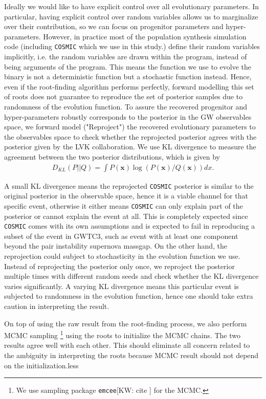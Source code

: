 \documentclass[twocolumn]{aastex631}
\newcommand{\kw}[1]{{\color{rb4}[KW: #1 ]}}
\begin{document}
Ideally we would like to have explicit control over all evolutionary parameters.
In particular, having explicit control over random variables allows us to marginalize over their contribution, so we can focus on progenitor parameters and hyper-parameters.
However, in practice most of the population synthesis simulation code (including \texttt{COSMIC} which we use in this study.) define their random variables implicitly,
i.e. the random variables are drawn within the program, instead of being arguments of the program.
This means the function we use to evolve the binary is not a deterministic function but a stochastic function instead. 
Hence, even if the root-finding algorithm performs perfectly,
forward modelling this set of roots does not guarantee to reproduce the set of posterior samples due to randomness of the evolution function.
To assure the recovered progenitor and hyper-parameters robustly corresponds to the posterior in the GW observables space,
we forward model ("Reproject") the recovered evolutionary parameters to the observables space to check whether the reprojected posterior agrees with the posterior given by the LVK collaboration.
We use KL divergence to measure the agreement between the two posterior distributions, which is given by
\begin{align}
D_{KL}(P||Q) = \int P(\bm{x}) \log(P(\bm{x})/Q(\bm{x})) dx.
\label{eq:KLdivergence}
\end{align}

A small KL divergence means the reprojected \texttt{COSMIC} posterior is similar to the original posterior in the observable space, hence it is a viable channel for that specific event, otherwise it either means \texttt{COSMIC} can only explain part of the posterior or cannot explain the event at all.
This is completely expected since \texttt{COSMIC} comes with its own assumptions and is expected to fail in reproducing a subset of the event in GWTC3, such as event with at least one component beyond the pair instability supernova massgap.
On the other hand, the reprojection could subject to stochasticity in the evolution function we use.
Instead of reprojecting the posterior only once, we reproject the posterior multiple times with different random seeds and check whether the KL divergence varies significantly.
A varying KL divergence means this particular event is subjected to randomness in the evolution function, hence one should take extra caution in interpreting the result.

On top of using the raw result from the root-finding process, we also perform MCMC sampling \footnote{We use sampling package \texttt{emcee}\kw{cite} for the MCMC.} using the roots to initialize the MCMC chains.
The two results agree well with each other.
This should eliminate all concern related to the ambiguity in interpreting the roots because MCMC result should not depend on the initialization.less
\end{document}
